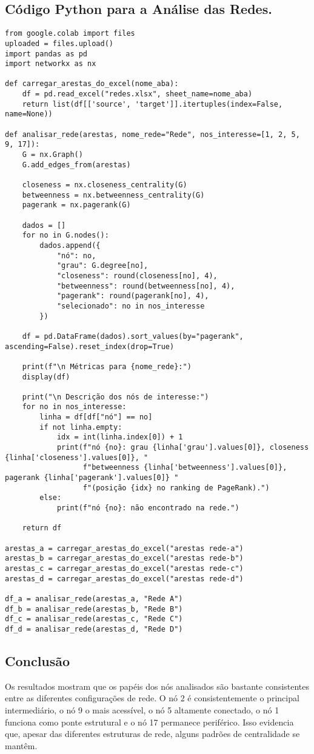 \documentclass[a4paper]{article}
\begin{document}
\subsection{Código Python para a Análise das Redes.}

\begin{verbatim}
from google.colab import files
uploaded = files.upload()
import pandas as pd
import networkx as nx

def carregar_arestas_do_excel(nome_aba):
    df = pd.read_excel("redes.xlsx", sheet_name=nome_aba)
    return list(df[['source', 'target']].itertuples(index=False, name=None))

def analisar_rede(arestas, nome_rede="Rede", nos_interesse=[1, 2, 5, 9, 17]):
    G = nx.Graph()
    G.add_edges_from(arestas)

    closeness = nx.closeness_centrality(G)
    betweenness = nx.betweenness_centrality(G)
    pagerank = nx.pagerank(G)

    dados = []
    for no in G.nodes():
        dados.append({
            "nó": no,
            "grau": G.degree[no],
            "closeness": round(closeness[no], 4),
            "betweenness": round(betweenness[no], 4),
            "pagerank": round(pagerank[no], 4),
            "selecionado": no in nos_interesse
        })

    df = pd.DataFrame(dados).sort_values(by="pagerank", ascending=False).reset_index(drop=True)

    print(f"\n Métricas para {nome_rede}:")
    display(df)

    print("\n Descrição dos nós de interesse:")
    for no in nos_interesse:
        linha = df[df["nó"] == no]
        if not linha.empty:
            idx = int(linha.index[0]) + 1
            print(f"nó {no}: grau {linha['grau'].values[0]}, closeness {linha['closeness'].values[0]}, "
                  f"betweenness {linha['betweenness'].values[0]}, pagerank {linha['pagerank'].values[0]} "
                  f"(posição {idx} no ranking de PageRank).")
        else:
            print(f"nó {no}: não encontrado na rede.")

    return df

arestas_a = carregar_arestas_do_excel("arestas rede-a")
arestas_b = carregar_arestas_do_excel("arestas rede-b")
arestas_c = carregar_arestas_do_excel("arestas rede-c")
arestas_d = carregar_arestas_do_excel("arestas rede-d")

df_a = analisar_rede(arestas_a, "Rede A")
df_b = analisar_rede(arestas_b, "Rede B")
df_c = analisar_rede(arestas_c, "Rede C")
df_d = analisar_rede(arestas_d, "Rede D")
\end{verbatim}

\subsection*{Conclusão}

Os resultados mostram que os papéis dos nós analisados são bastante consistentes entre as diferentes configurações de rede. O nó 2 é consistentemente o principal intermediário, o nó 9 o mais acessível, o nó 5 altamente conectado, o nó 1 funciona como ponte estrutural e o nó 17 permanece periférico. Isso evidencia que, apesar das diferentes estruturas de rede, alguns padrões de centralidade se mantêm.
\end{document}
